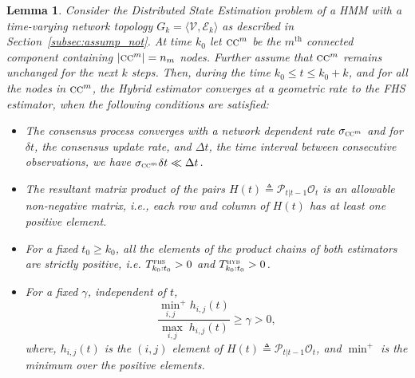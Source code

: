 \documentclass[journal]{IEEEtran}
\newtheorem{lemma}[theorem]{Lemma}
\theoremstyle{remark}
\newcommand{\suf}[1]{\textsc{\tiny #1}}  %
\theoremstyle{definition}
\begin{document}
\begin{lemma}
\label{lemma:l1convergence}
Consider the Distributed State Estimation problem of a HMM with a time-varying
network topology $G_{k} = \langle \mathcal{V},\mathcal{E}_k\rangle$ as
described in Section~\ref{subsec:assump_not}. At time $k_0$ let $\textsc{cc}^m$
be the $m^\text{th}$ connected component containing $|\textsc{cc}^m|=n_m$ nodes.
Further assume that $\textsc{cc}^m$ remains unchanged for the next $k$ steps.
Then, during the time $k_0 \leq t\leq k_0+k$, and for all the nodes in
$\textsc{cc}^m$, the Hybrid estimator converges at a geometric rate to the FHS
estimator, when the following conditions are satisfied:

\begin{itemize}
\item The consensus process converges with a network dependent rate
$\sigma_{{\textsc{cc}^m}}$ and for $\delta t$, the consensus update rate, and
$\Delta t$, the time interval between consecutive observations, we have
$\sigma_{{\textsc{cc}^m}}\delta t \ll \Delta t$. 

\item The resultant matrix product of the pairs
$H(t)\triangleq\mathcal{P}_{t\vert t-1}\mathcal{O}_{t}$ is an allowable
non-negative matrix, i.e., each row and column of $H(t)$ has at least one
positive element. 

\item For a fixed $t_0\geq k_0$, all the elements of the product chains of both
estimators are strictly positive, i.e. ${T}_{k_0:t_0}^{\suf{FHS}}>0$ and
${T}_{k_0:t_0}^{\suf{HYB}}>0$.

\item For a fixed $\gamma$, independent of $t$,
\begin{equation}
\frac{\underset{i,j}{\min}^+ h_{i,j}(t)}{\underset{i,j}{\max}\; h_{i,j}(t)}\geq\gamma >0,
\end{equation}
where, $h_{i,j}(t)$ is the $(i,j)$ element of $H(t)\triangleq\mathcal{P}_{t\vert t-1}\mathcal{O}_{t}$,  and $\min^+$ is the minimum over the positive elements.
\end{itemize}
\end{lemma}
\end{document}
